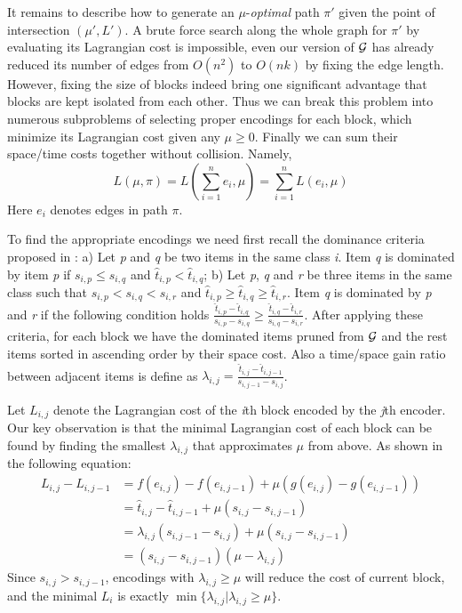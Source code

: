 \documentclass{sig-alternate-05-2015}
\begin{document}
It remains to describe how to generate an $ \mu $-\textit{optimal} path $ \pi' $ given the point of intersection $ (\mu',L') $.
A brute force search along the whole graph for $ \pi' $ by evaluating its Lagrangian cost is impossible,
even our version of  $ \cal G $ has already reduced its number of edges from $ O(n^2) $ to $ O(nk) $ by fixing the edge length.
However, fixing the size of blocks indeed bring one significant advantage that blocks are kept isolated from each other.
Thus we can break this problem into numerous subproblems of selecting proper encodings for each block, which minimize its Lagrangian cost given any $ \mu \geqslant 0 $.
Finally we can sum their space/time costs together without collision.
Namely,
\begin{equation*}
L(\mu,\pi) = L(\sum_{i=1}^{n} e_i, \mu)=\sum_{i=1}^{n}L(e_i,\mu)
\end{equation*}
Here $ e_i $ denotes edges in path $ \pi $.

To find the appropriate encodings we need first recall the dominance criteria proposed in \cite{ottaviano2015optimal}: a) Let \textit{p} and \textit{q} be two items in the same class \textit{i}.
Item \textit{q} is dominated by item \textit{p} if $ s_{i,p} \leqslant s_{i,q} $ and $ \hat{t}_{i,p} < \hat{t}_{i,q} $;
b) Let \textit{p}, \textit{q} and \textit{r} be three items in the same class such that $ s_{i,p} < s_{i,q} < s_{i,r} $ and $ \hat{t}_{i,p} \geqslant \hat{t}_{i,q} \geqslant \hat{t}_{i,r} $.
Item \textit{q} is dominated by \textit{p} and \textit{r} if the following condition holds $ \frac{\hat{t}_{i,p} - \hat{t}_{i,q}}{s_{i,p} - s_{i,q}} \geqslant \frac{\hat{t}_{i,q} - \hat{t}_{i,r}}{s_{i,q} - s_{i,r}} $.
After applying these criteria, for each block we have the dominated items pruned from $ \cal G $ and the rest items sorted in ascending order by their space cost.
Also a time/space gain ratio between adjacent items is define as $ \lambda_{i,j} = \frac{\hat{t}_{i,j} - \hat{t}_{i,j-1}}{s_{i,j-1} - s_{i,j}} $.

Let $ L_{i,j} $ denote the Lagrangian cost of the \textit{i}th block encoded by the \textit{j}th encoder.
Our key observation is that the minimal Lagrangian cost of each block can be found by finding the smallest $ \lambda_{i,j} $ that approximates $ \mu $ from above.
As shown in the following equation:
\begin{equation}
\begin{split}
L_{i,j} - L_{i,j-1} &= f(e_{i,j}) - f(e_{i,j-1}) + \mu (g(e_{i,j}) - g(e_{i,j-1})) \\
	&= \hat{t}_{i,j} - \hat{t}_{i,j-1} + \mu (s_{i,j} - s_{i,j-1}) \\
	&= \lambda_{i,j}(s_{i,j-1} - s_{i,j}) + \mu (s_{i,j} - s_{i,j-1}) \\
	&= (s_{i,j} - s_{i,j-1})(\mu - \lambda_{i,j})
\end{split}
\end{equation}
Since $ s_{i,j} > s_{i,j-1} $, encodings with $ \lambda_{i,j} \geqslant \mu $ will reduce the cost of current block,
and the minimal $ L_i $ is exactly $\min\{ \lambda_{i,j}| \lambda_{i,j} \geqslant \mu \} $.
\end{document}
